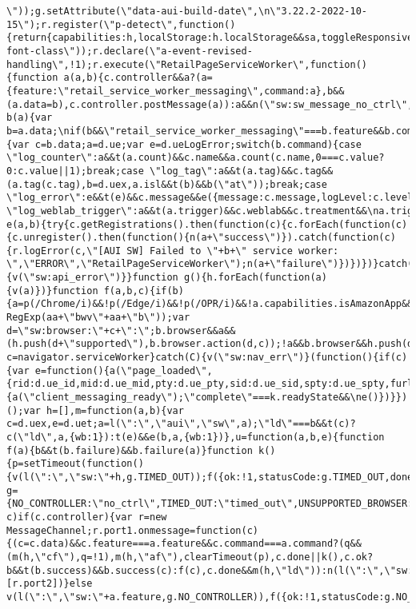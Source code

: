 \documentclass[
]{article}
\begin{document}
\begin{verbatim}
\"));g.setAttribute(\"data-aui-build-date\",\n\"3.22.2-2022-10-15\");r.register(\"p-detect\",function(){return{capabilities:h,localStorage:h.localStorage&&sa,toggleResponsiveGrid:ya,responsiveGridEnabled:za}});p(/UCBrowser/i)||h.localStorage&&E(g,sa.getItem(\"a-font-class\"));r.declare(\"a-event-revised-handling\",!1);r.execute(\"RetailPageServiceWorker\",function(){function a(a,b){c.controller&&a?(a={feature:\"retail_service_worker_messaging\",command:a},b&&(a.data=b),c.controller.postMessage(a)):a&&n(\"sw:sw_message_no_ctrl\",1)}function b(a){var b=a.data;\nif(b&&\"retail_service_worker_messaging\"===b.feature&&b.command&&b.data){var c=b.data;a=d.ue;var e=d.ueLogError;switch(b.command){case \"log_counter\":a&&t(a.count)&&c.name&&a.count(c.name,0===c.value?0:c.value||1);break;case \"log_tag\":a&&t(a.tag)&&c.tag&&(a.tag(c.tag),b=d.uex,a.isl&&t(b)&&b(\"at\"));break;case \"log_error\":e&&t(e)&&c.message&&e({message:c.message,logLevel:c.level||\"ERROR\",attribution:c.attribution||\"RetailServiceWorker\"});break;case \"log_weblab_trigger\":a&&t(a.trigger)&&c.weblab&&c.treatment&&\na.trigger(c.weblab,c.treatment);break;default:n(\"sw:unsupported_message_command\",1)}}}function e(a,b){try{c.getRegistrations().then(function(c){c.forEach(function(c){c.unregister().then(function(){n(a+\"success\")}).catch(function(c){r.logError(c,\"[AUI SW] Failed to \"+b+\" service worker: \",\"ERROR\",\"RetailPageServiceWorker\");n(a+\"failure\")})})})}catch(Ba){v(\"sw:api_error\")}}function g(){h.forEach(function(a){v(a)})}function f(a,b,c){if(b){a=p(/Chrome/i)&&!p(/Edge/i)&&!p(/OPR/i)&&!a.capabilities.isAmazonApp&&\n!p(new RegExp(aa+\"bwv\"+aa+\"b\"));var d=\"sw:browser:\"+c+\":\";b.browser&&a&&(h.push(d+\"supported\"),b.browser.action(d,c));!a&&b.browser&&h.push(d+\"unsupported\")}}try{var c=navigator.serviceWorker}catch(C){v(\"sw:nav_err\")}(function(){if(c){var e=function(){a(\"page_loaded\",{rid:d.ue_id,mid:d.ue_mid,pty:d.ue_pty,sid:d.ue_sid,spty:d.ue_spty,furl:d.ue_furl})};y(c,\"message\",b);a(\"client_messaging_ready\");r.when(\"load\").execute(e);y(c,\"controllerchange\",function(){a(\"client_messaging_ready\");\"complete\"===k.readyState&&\ne()})}})();var h=[],m=function(a,b){var c=d.uex,e=d.uet;a=l(\":\",\"aui\",\"sw\",a);\"ld\"===b&&t(c)?c(\"ld\",a,{wb:1}):t(e)&&e(b,a,{wb:1})},u=function(a,b,e){function f(a){b&&t(b.failure)&&b.failure(a)}function k(){p=setTimeout(function(){v(l(\":\",\"sw:\"+h,g.TIMED_OUT));f({ok:!1,statusCode:g.TIMED_OUT,done:!1});m(h,\"ld\")},e||4E3)}var g={NO_CONTROLLER:\"no_ctrl\",TIMED_OUT:\"timed_out\",UNSUPPORTED_BROWSER:\"unsupported_browser\",UNEXPECTED_RESPONSE:\"unexpected_response\"},h=l(\":\",a.feature,a.command),p,q=!0;if(\"MessageChannel\"in\nd&&c&&\"controller\"in c)if(c.controller){var r=new MessageChannel;r.port1.onmessage=function(c){(c=c.data)&&c.feature===a.feature&&c.command===a.command?(q&&(m(h,\"cf\"),q=!1),m(h,\"af\"),clearTimeout(p),c.done||k(),c.ok?b&&t(b.success)&&b.success(c):f(c),c.done&&m(h,\"ld\")):n(l(\":\",\"sw:\"+h,g.UNEXPECTED_RESPONSE),1)};k();m(h,\"bb\");c.controller.postMessage(a,[r.port2])}else v(l(\":\",\"sw:\"+a.feature,g.NO_CONTROLLER)),f({ok:!1,statusCode:g.NO_CONTROLLER,done:!0});else 
\end{verbatim}
\end{document}
